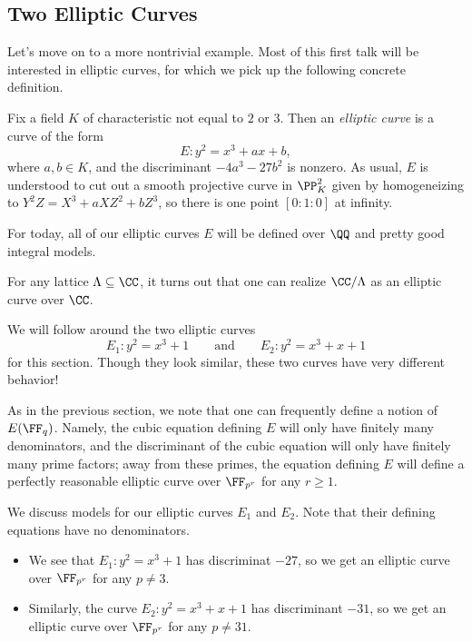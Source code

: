 \documentclass{article}
\begin{document}
\subsection{Two Elliptic Curves}
Let's move on to a more nontrivial example. Most of this first talk will be interested in elliptic curves, for which we pick up the following concrete definition.
\begin{definition}
	Fix a field $K$ of characteristic not equal to $2$ or $3$. Then an \textit{elliptic curve} is a curve of the form
	\[E\colon y^2=x^3+ax+b,\]
	where $a,b\in K$, and the discriminant $-4a^3-27b^2$ is nonzero. As usual, $E$ is understood to cut out a smooth projective curve in $\PP^2_K$ given by homogeneizing to $Y^2Z=X^3+aXZ^2+bZ^3$, so there is one point $[0:1:0]$ at infinity.
\end{definition}
For today, all of our elliptic curves $E$ will be defined over $\QQ$ and pretty good integral models.
\begin{example} \label{ex:ec-as-c-mod-lattice}
	For any lattice $\Lambda\subseteq\CC$, it turns out that one can realize $\CC/\Lambda$ as an elliptic curve over $\CC$.
\end{example}
\begin{example}
	We will follow around the two elliptic curves
	\[E_1\colon y^2=x^3+1\qquad\text{and}\qquad E_2\colon y^2=x^3+x+1\]
	for this section. Though they look similar, these two curves have very different behavior!
\end{example}
As in the previous section, we note that one can frequently define a notion of $E(\FF_q)$. Namely, the cubic equation defining $E$ will only have finitely many denominators, and the discriminant of the cubic equation will only have finitely many prime factors; away from these primes, the equation defining $E$ will define a perfectly reasonable elliptic curve over $\FF_{p^r}$ for any $r\ge1$.
\begin{example}
	We discuss models for our elliptic curves $E_1$ and $E_2$. Note that their defining equations have no denominators.
	\begin{itemize}
		\item We see that $E_1\colon y^2=x^3+1$ has discriminat $-27$, so we get an elliptic curve over $\FF_{p^r}$ for any $p\ne3$.
		\item Similarly, the curve $E_2\colon y^2=x^3+x+1$ has discriminant $-31$, so we get an elliptic curve over $\FF_{p^r}$ for any $p\ne31$.
	\end{itemize}
\end{example}
\end{document}
